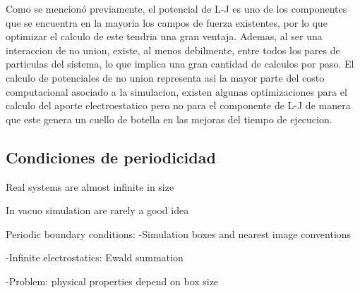 \documentclass[a4paper,10pt]{report}
\begin{document}
Como se mencionó previamente, el potencial de L-J es uno de los componentes que se encuentra en la mayoria los campos de fuerza existentes, por lo que optimizar el calculo de este tendria una gran ventaja. 
Ademas, al ser una interaccion de no union, existe, al menos debilmente, entre todos los pares de particulas del sistema, lo que implica una gran cantidad de calculos por paso. El calculo de potenciales de no union representa asi la mayor parte del costo computacional asociado a la simulacion, existen algunas optimizaciones para el calculo del aporte electroestatico pero no para el componente de L-J de manera que este genera un cuello de botella en las mejoras del tiempo de ejecucion.





\subsection{Condiciones de periodicidad}


Real systems are almost infinite in size

In vacuo simulation are rarely a good idea

Periodic boundary conditions: 
-Simulation boxes and nearest image conventions

-Infinite electrostatics: Ewald summation

-Problem: physical properties depend on box size







%  
\end{document}
